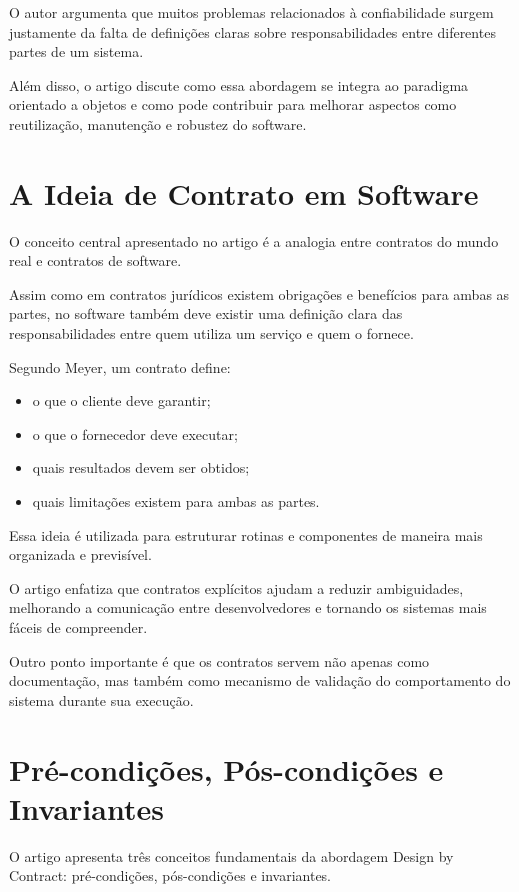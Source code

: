 \documentclass[conference]{IEEEtran}
\begin{document}
O autor argumenta que muitos problemas relacionados à confiabilidade surgem justamente da falta de definições claras sobre responsabilidades entre diferentes partes de um sistema.

Além disso, o artigo discute como essa abordagem se integra ao paradigma orientado a objetos e como pode contribuir para melhorar aspectos como reutilização, manutenção e robustez do software.

\section{A Ideia de Contrato em Software}

O conceito central apresentado no artigo é a analogia entre contratos do mundo real e contratos de software.

Assim como em contratos jurídicos existem obrigações e benefícios para ambas as partes, no software também deve existir uma definição clara das responsabilidades entre quem utiliza um serviço e quem o fornece.

Segundo Meyer, um contrato define:
\begin{itemize}
\item o que o cliente deve garantir;
\item o que o fornecedor deve executar;
\item quais resultados devem ser obtidos;
\item quais limitações existem para ambas as partes.
\end{itemize}

Essa ideia é utilizada para estruturar rotinas e componentes de maneira mais organizada e previsível.

O artigo enfatiza que contratos explícitos ajudam a reduzir ambiguidades, melhorando a comunicação entre desenvolvedores e tornando os sistemas mais fáceis de compreender.

Outro ponto importante é que os contratos servem não apenas como documentação, mas também como mecanismo de validação do comportamento do sistema durante sua execução.

\section{Pré-condições, Pós-condições e Invariantes}

O artigo apresenta três conceitos fundamentais da abordagem Design by Contract: pré-condições, pós-condições e invariantes.
\end{document}
